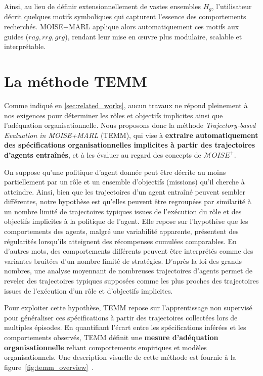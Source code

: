 \documentclass[francais,ROIA,Unicode,manuscript]{cedram}
\begin{document}
Ainsi, au lieu de définir extensionnellement de vastes ensembles \(H_g\), l’utilisateur décrit quelques motifs symboliques qui capturent l’essence des comportements recherchés. MOISE+MARL applique alors automatiquement ces motifs aux guides (\(rag, rrg, grg\)), rendant leur mise en œuvre plus modulaire, scalable et interprétable.


\section{La méthode TEMM}
\label{sec:TEMM_algorithm}

Comme indiqué en \autoref{sec:related_works}, aucun travaux ne répond pleinement à nos exigences pour déterminer les rôles et objectifs implicites ainsi que l'adéquation organisationnelle. Nous proposons donc la méthode \textit{Trajectory-based Evaluation in MOISE+MARL} (TEMM), qui vise à \textbf{extraire automatiquement des spécifications organisationnelles implicites à partir des trajectoires d’agents entraînés}, et à les évaluer au regard des concepts de \(\mathcal{M}OISE^+\).

On suppose qu'une politique d'agent donnée peut être décrite au moins partiellement par un rôle et un ensemble d'objectifs (missions) qu'il cherche à atteindre. Ainsi, bien que les trajectoires d'un agent entraîné peuvent sembler différentes, notre hypothèse est qu'elles peuvent être regroupées par similarité à un nombre limité de trajectoires typiques issues de l’exécution du rôle et des objectifs implicites à la politique de l'agent. Elle repose sur l’hypothèse que les comportements des agents, malgré une variabilité apparente, présentent des régularités lorsqu'ils atteignent des récompenses cumulées comparables. En d'autres mots, des comportements différents peuvent être interprétés comme des variantes bruitées d'un nombre limité de stratégies. D’après la loi des grands nombres, une analyse moyennant de nombreuses trajectoires d'agents permet de reveler des trajectoires typiques supposées comme les plus proches des trajectoires issues de l'exécution d'un rôle et d'objectifs implicites.

Pour exploiter cette hypothèse, TEMM repose sur l’apprentissage non supervisé pour généraliser ces spécifications à partir des trajectoires collectées lors de multiples épisodes. En quantifiant l’écart entre les spécifications inférées et les comportements observés, TEMM définit une \textbf{mesure d’adéquation organisationnelle} reliant comportements empiriques et modèles organisationnels.
%
Une description visuelle de cette méthode est fournie à la figure~\ref{fig:temm_overview}~\hyperref[fn:github]{\footnotemark[2]}.
\end{document}
